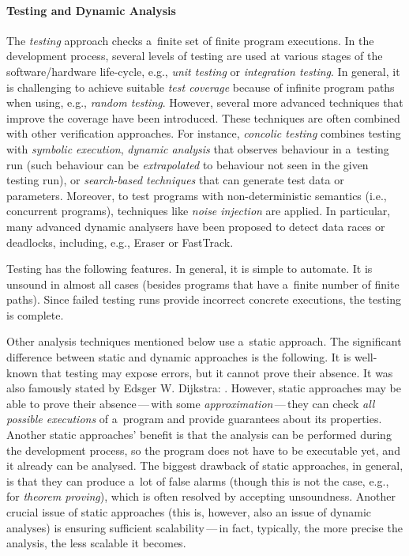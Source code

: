 \paragraph{Testing and Dynamic Analysis}
The \emph{testing} approach checks a~finite set of finite program executions. In the development process, several levels of testing are used at various stages of the software/hardware life-cycle, e.g., \emph{unit testing} or \emph{integration testing}. In general, it is challenging to achieve suitable \emph{test coverage} because of infinite program paths when using, e.g., \emph{random testing}. However, several more advanced techniques that improve the coverage have been introduced. These techniques are often combined with other verification approaches. For instance, \emph{concolic testing} combines testing with \emph{symbolic execution}, \emph{dynamic analysis} that observes behaviour in a~testing run (such behaviour can be \emph{extrapolated} to behaviour not seen in the given testing run), or \emph{search-based techniques} that can generate test data or parameters. Moreover, to test programs with non-deterministic semantics (i.e., concurrent programs), techniques like \emph{noise injection} are applied. In particular, many advanced dynamic analysers have been proposed to detect data races or deadlocks, including, e.g., Eraser or FastTrack.

Testing has the following features. In general, it is simple to automate. It is unsound in almost all cases (besides programs that have a~finite number of finite paths). Since failed testing runs provide incorrect concrete executions, the testing is complete.

Other analysis techniques mentioned below use a~static approach. The significant difference between static and dynamic approaches is the following. It is well-known that testing may expose errors, but it cannot prove their absence. It was also famously stated by Edsger W. Dijkstra: . However, static approaches may be able to prove their absence\,---\,with some \emph{approximation}\,---\,they can check \emph{all possible executions} of a~program and provide guarantees about its properties. Another static approaches' benefit is that the analysis can be performed during the development process, so the program does not have to be executable yet, and it already can be analysed. The biggest drawback of static approaches, in general, is that they can produce a~lot of false alarms (though this is not the case, e.g., for \emph{theorem proving}), which is often resolved by accepting unsoundness. Another crucial issue of static approaches (this is, however, also an issue of dynamic analyses) is ensuring sufficient scalability\,---\,in fact, typically, the more precise the analysis, the less scalable it becomes.


